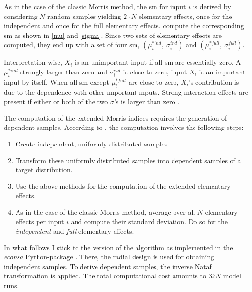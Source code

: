 As in the case of the classic Morris method, the sm for input $i$ is derived by considering $N$ random samples yielding $2 \cdot N$ elementary effects, once for the independent and once for the full elementary effects. \citet{GM17} compute the corresponding sm as shown in \cref{mu} and \cref{sigma}. Since two sets of elementary effects are computed, they end up with a set of four sm, $(\mu^{\ast ind}_i,\ \sigma_i^{ind})$ and $(\mu^{\ast full}_i,\ \sigma_i^{full})$.

Interpretation-wise, $X_i$ is an unimportant input if all sm are essentially zero. A $\mu^{\ast ind}_i$ strongly larger than zero and $\sigma_i^{ind}$ is close to zero, input $X_i$ is an important input by itself. When all sm except $\mu^{\ast full}_i$ are close to zero, $X_i$'s contribution is due to the dependence with other important inputs. Strong interaction effects are present if either or both of the two $\sigma$'s is larger than zero \citep{GM17}.

The computation of the extended Morris indices requires the generation of dependent samples. According to \citet{GM17}, the computation involves the following steps:

\begin{enumerate}
    \item Create independent, uniformly distributed samples.
    \item Transform these uniformly distributed samples into dependent samples of a target distribution.
    \item Use the above methods for the computation of the extended elementary effects.
    \item As in the case of the classic Morris method, average over all $N$ elementary effects per input $i$ and compute their standard deviation. Do so for the \textit{independent} and \textit{full} elementary effects.
\end{enumerate}

In what follows I stick to the version of the algorithm as implemented in the \textit{econsa} Python-package \citep{OSE21}. There, the radial design is used for obtaining independent samples. To derive dependent samples, the inverse Nataf transformation is applied. The total computational cost amounts to $3kN$ model runs.



